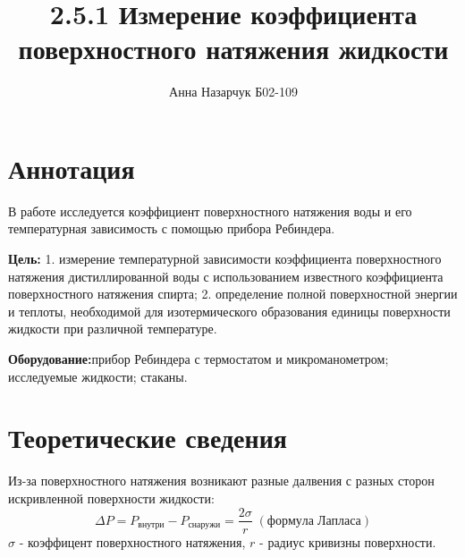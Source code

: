 \documentclass[a4paper,12pt]{article} %
\author{Анна Назарчук Б02-109}
\title{2.5.1 Измерение коэффициента поверхностного натяжения жидкости}
\date{}
\begin{document}
\maketitle
\section{Аннотация}
В работе исследуется коэффициент поверхностного натяжения воды и его температурная зависимость с помощью прибора Ребиндера.

\textbf{Цель:} 1. измерение температурной зависимости  коэффициента поверхностного натяжения дистиллированной воды с использованием известного коэффициента поверхностного натяжения спирта;  2. определение полной поверхностной энергии  и теплоты, необходимой для изотермического образования единицы  поверхности жидкости  при различной температуре. 

\textbf{Оборудование:}прибор  Ребиндера  с термостатом и микроманометром; исследуемые жидкости; стаканы.

\section{Теоретические сведения}
Из-за поверхностного натяжения возникают разные далвения с разных сторон искривленной поверхности жидкости:
\begin{equation}
\Delta P = P_{внутри} - P_{снаружи} = \frac{2\sigma}{r} \;(формула\; Лапласа)
\end{equation}
$\sigma$ - коэффицент поверхностного натяжения, $r$ - радиус кривизны поверхности.
\end{document}
